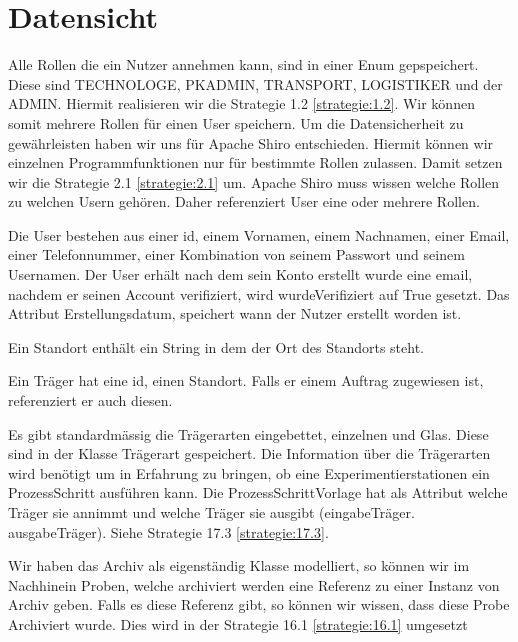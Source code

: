 \documentclass[enabledeprecatedfontcommands,fontsize=12pt,paper=a4,twoside]{scrartcl}
\begin{document}
\section{Datensicht}
\label{sec:datensicht}

{

Alle Rollen die ein Nutzer annehmen kann, sind in einer Enum gepspeichert. Diese
sind TECHNOLOGE, PKADMIN, TRANSPORT, LOGISTIKER und der ADMIN. Hiermit
realisieren wir die Strategie 1.2 \ref{strategie:1.2}. Wir können somit mehrere Rollen für einen
User speichern. Um die Datensicherheit zu gewährleisten haben wir uns für
Apache Shiro entschieden. Hiermit können wir einzelnen Programmfunktionen nur
für bestimmte Rollen zulassen. Damit setzen wir die Strategie 2.1 \ref{strategie:2.1} um. Apache
Shiro muss wissen welche Rollen zu welchen Usern gehören. Daher referenziert
User eine oder mehrere Rollen.


Die User bestehen aus einer id, einem Vornamen, einem Nachnamen, einer Email,
einer Telefonnummer, einer Kombination von seinem Passwort und seinem Usernamen.
Der User erhält nach dem sein Konto erstellt wurde eine email, nachdem er seinen
Account verifiziert, wird wurdeVerifiziert auf True gesetzt. Das Attribut
Erstellungsdatum, speichert wann der Nutzer erstellt worden ist.

Ein Standort enthält ein String in dem der Ort des Standorts steht.

Ein Träger hat eine id, einen Standort. Falls er einem Auftrag zugewiesen ist,
referenziert er auch diesen.

Es gibt standardmässig die Trägerarten eingebettet, einzelnen und Glas. Diese sind in
der Klasse Trägerart gespeichert. Die Information über die Trägerarten wird
benötigt um in Erfahrung zu bringen, ob eine Experimentierstationen ein
ProzessSchritt ausführen kann. Die ProzessSchrittVorlage hat als Attribut welche
Träger sie annimmt und welche Träger sie ausgibt (eingabeTräger. ausgabeTräger).
Siehe Strategie 17.3 \ref{strategie:17.3}.

Wir haben das Archiv als eigenständig Klasse modelliert, so können wir im
Nachhinein Proben, welche archiviert werden eine Referenz zu einer Instanz von
Archiv geben. Falls es diese Referenz gibt, so können wir wissen, dass diese
Probe Archiviert wurde. Dies wird in der Strategie 16.1 \ref{strategie:16.1} umgesetzt

}
\end{document}
